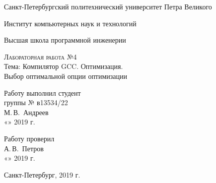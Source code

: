 \documentclass[12pt,a4paper]{scrartcl}
\begin{document}
\begin{titlepage}
  \begin{center}
    \large




    \vspace{0.5cm}

    Санкт-Петербургский политехнический университет Петра Великого
    \vspace{0.25cm}
    
    Институт компьютерных наук и технологий
    
    \vspace{0.25cm}
    Высшая школа программной инженерии
    \vfill

    \textsc{Лабораторная работа №4}\\[5mm]
    \bigskip
    {\LARGE Тема: Компилятор GCC. Оптимизация.\\
      Выбор оптимальной опции оптимизации}
  \bigskip
    
    
\end{center}
\vfill

 \newlength{\ML}
\hfill\begin{minipage}{0.5\textwidth}
Работу выполнил студент\\
группы № в13534/22\\
  \underline{\hspace{\ML}} М.\,В.~Андреев\\
  «\underline{\hspace{0.7cm}}» \underline{\hspace{2cm}} 2019 г.
\end{minipage}%
\bigskip
\vfill
 \newlength{\ML}

\hfill\begin{minipage}{0.5\textwidth}
  Работу проверил\\
  \underline{\hspace{\ML}} А.\,В.~Петров\\
  «\underline{\hspace{0.7cm}}» \underline{\hspace{2cm}} 2019 г.
\end{minipage}%
\bigskip
\vfill

\begin{center}
  Санкт-Петербург, 2019 г.
\end{center}
\end{titlepage}
\end{document}
